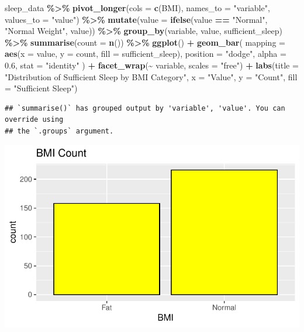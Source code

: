 \documentclass[
  11pt,
]{article}
\newenvironment{Shaded}{\begin{snugshade}}{\end{snugshade}}
\newcommand{\AttributeTok}[1]{\textcolor[rgb]{0.13,0.29,0.53}{#1}}
\newcommand{\FloatTok}[1]{\textcolor[rgb]{0.00,0.00,0.81}{#1}}
\newcommand{\FunctionTok}[1]{\textcolor[rgb]{0.13,0.29,0.53}{\textbf{#1}}}
\newcommand{\NormalTok}[1]{#1}
\newcommand{\SpecialCharTok}[1]{\textcolor[rgb]{0.81,0.36,0.00}{\textbf{#1}}}
\newcommand{\StringTok}[1]{\textcolor[rgb]{0.31,0.60,0.02}{#1}}
\begin{document}
\begin{Shaded}
\begin{Highlighting}[]
\NormalTok{sleep\_data }\SpecialCharTok{\%\textgreater{}\%}
  \FunctionTok{pivot\_longer}\NormalTok{(}\AttributeTok{cols =} \FunctionTok{c}\NormalTok{(BMI), }\AttributeTok{names\_to =} \StringTok{"variable"}\NormalTok{, }\AttributeTok{values\_to =} \StringTok{"value"}\NormalTok{) }\SpecialCharTok{\%\textgreater{}\%}
  \FunctionTok{mutate}\NormalTok{(}\AttributeTok{value =} \FunctionTok{ifelse}\NormalTok{(value }\SpecialCharTok{==} \StringTok{"Normal"}\NormalTok{, }\StringTok{"Normal Weight"}\NormalTok{, value)) }\SpecialCharTok{\%\textgreater{}\%}
  \FunctionTok{group\_by}\NormalTok{(variable, value, sufficient\_sleep) }\SpecialCharTok{\%\textgreater{}\%}
  \FunctionTok{summarise}\NormalTok{(}\AttributeTok{count =} \FunctionTok{n}\NormalTok{()) }\SpecialCharTok{\%\textgreater{}\%}
  \FunctionTok{ggplot}\NormalTok{() }\SpecialCharTok{+}
  \FunctionTok{geom\_bar}\NormalTok{(}
    \AttributeTok{mapping =} \FunctionTok{aes}\NormalTok{(}\AttributeTok{x =}\NormalTok{ value, }\AttributeTok{y =}\NormalTok{ count, }\AttributeTok{fill =}\NormalTok{ sufficient\_sleep),}
    \AttributeTok{position =} \StringTok{"dodge"}\NormalTok{,   }
    \AttributeTok{alpha =} \FloatTok{0.6}\NormalTok{,}
    \AttributeTok{stat =} \StringTok{"identity"}
\NormalTok{  ) }\SpecialCharTok{+}
  \FunctionTok{facet\_wrap}\NormalTok{(}\SpecialCharTok{\textasciitilde{}}\NormalTok{ variable, }\AttributeTok{scales =} \StringTok{"free"}\NormalTok{) }\SpecialCharTok{+}
  \FunctionTok{labs}\NormalTok{(}\AttributeTok{title =} \StringTok{"Distribution of Sufficient Sleep by BMI Category"}\NormalTok{,}
       \AttributeTok{x =} \StringTok{"Value"}\NormalTok{, }
       \AttributeTok{y =} \StringTok{"Count"}\NormalTok{, }
       \AttributeTok{fill =} \StringTok{"Sufficient Sleep"}\NormalTok{)}
\end{Highlighting}
\end{Shaded}

\begin{verbatim}
## `summarise()` has grouped output by 'variable', 'value'. You can override using
## the `.groups` argument.
\end{verbatim}

\begin{center}\includegraphics[width=0.7\linewidth]{SleepHelath_files/figure-latex/unnamed-chunk-41-1} \end{center}
\end{document}
